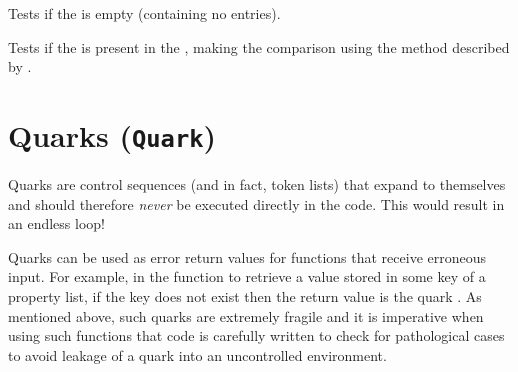 \documentclass[oneside]{book}
\begin{document}
\begin{function}{\PropVarIfEmpty}
\begin{syntax}
 
   
\end{syntax}
Tests if the  is empty (containing no entries).
\begin{demohigh}
\PropSetFromKeyval {}
\PropVarIfEmptyTF {} {}
\PropClear \lTmpaProp
\PropVarIfEmptyTF {} {}
\end{demohigh}
\end{function}

\begin{function}{\PropVarIfIn}
\begin{syntax}
    
\end{syntax}
Tests if the  is present in the ,
making the comparison using the method described by .
\begin{demohigh}
\PropSetFromKeyval {}
\PropVarIfInTF {} {} {}
\PropVarIfInTF {} {} {}
\end{demohigh}
\end{function}

\chapter{Quarks (\texttt{Quark})}


Quarks are control sequences (and in fact, token lists) that expand
to themselves and should therefore \emph{never} be executed directly
in the code. This would result in an endless loop!

Quarks can be used as error return values for functions that receive erroneous input.
For example, in the function  to retrieve a value stored
in some key of a property list, if the key does not exist then the return value
is the quark .
As mentioned above, such quarks are extremely fragile and it is imperative
when using such functions that code is carefully written to check for
pathological cases to avoid leakage of a quark into an uncontrolled
environment.
\end{document}
